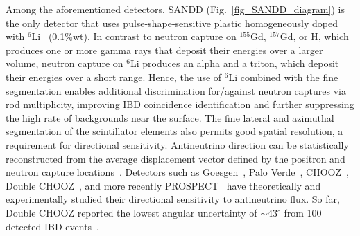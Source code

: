 \documentclass[final,5p,times,twocolumn]{elsarticle}
\begin{document}
Among the aforementioned detectors, SANDD (Fig.~\ref{fig_SANDD_diagram}) is the only detector that uses pulse-shape-sensitive plastic homogeneously doped with $^6$Li~\cite{ZAITSEVA2013747} (0.1\%wt).
In contrast to neutron capture on $^{155}$Gd, $^{157}$Gd, or H, which produces one or more gamma rays that deposit their energies over a larger volume, neutron capture on $^6$Li produces an alpha and a triton, which deposit their energies over a short range. 
Hence, the use of $^6$Li combined with the fine segmentation enables additional discrimination for/against neutron captures via rod multiplicity, improving IBD coincidence identification and further suppressing the high rate of backgrounds near the surface.
The fine lateral and azimuthal segmentation of the scintillator elements also permits good spatial resolution, a requirement for directional sensitivity. Antineutrino direction can be statistically reconstructed from the average displacement vector defined by the positron and neutron capture locations~\cite{Vogel:1999zy}.
Detectors such as Goesgen~\cite{goesgenPaloVerde_direction,Gosgen_direction}, Palo Verde~\cite{goesgenPaloVerde_direction,PaloVerde_direction}, CHOOZ~\cite{Chooz_direction}, Double CHOOZ~\cite{cadenThesis,langbrandtnerThesis,caden_hawaii}, and more recently PROSPECT~\cite{prospect2020} have theoretically and experimentally studied their directional sensitivity to antineutrino flux. So far, Double CHOOZ reported the lowest angular uncertainty of $\sim$43$^\circ$ from 100 detected IBD events~\cite{caden_hawaii}.%
\end{document}
